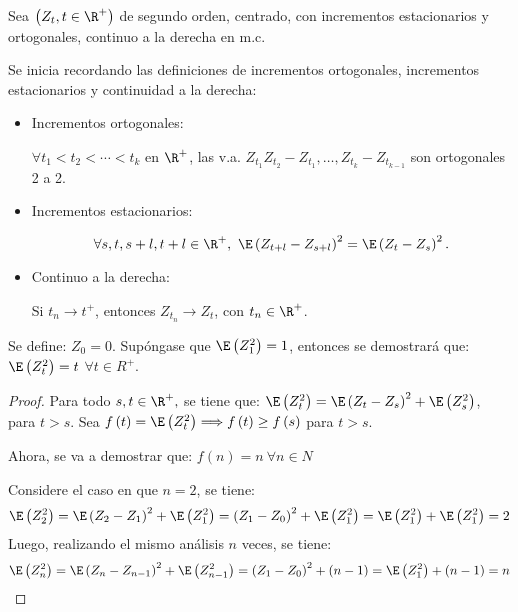\begin{ejemplo}
Sea $\left( Z_{t},t\in \R^{+} \right)$ de segundo orden, centrado, con incrementos estacionarios y ortogonales, continuo a la derecha en m.c. 

Se inicia recordando las definiciones de incrementos ortogonales, incrementos estacionarios y continuidad a la derecha:

\begin{itemize}
\item Incrementos ortogonales:\newline

$\forall t_{1}<t_{2}<\cdots <t_{k}$ en $\R^{+}$, las v.a. $Z_{t_{1}}Z_{t_{2}}-Z_{t_{1}},\ldots,Z_{t_{k}}-Z_{t_{k-1}}$ 
son ortogonales 2 a 2.


\item Incrementos estacionarios: 

\[
\forall  s,t,s+l,t+l \in \R^{+},\ \E\left(Z_{t+l}-Z_{s+l} \right)^{2}=\E\left( Z_{t}-Z_{s} \right)^{2}.
\]

\item Continuo a la derecha:\newline

Si $t_{n}\to t^{+}$, entonces $Z_{t_{n}}\to Z_{t}$, con $t_{n}\in\R^{+}$.

\end{itemize}

\begin{itemize}
\item Se define: $Z_{0}=0$. Sup\'{o}ngase que $\E\left( Z_{1}^{2} \right)=1$, entonces se demostrar\'{a} que: $\E\left( Z_{t}^{2} \right)=t$ $\forall t\in R^{+}$.

\begin{proof} 
Para todo $s,t \in \R^{+},$ se tiene que: $\E\left( Z_{t}^{2} \right)=\E\left( Z_{t}-Z_{s} \right)^{2}+\E\left( Z_{s}^{2} \right)$, para $t>s$. Sea $f\left( t \right)=\E\left( Z_{t}^{2} \right)\Longrightarrow f\left( t \right)\geq f\left( s \right)$ para $t>s$.

\item Ahora, se va a demostrar que: $f\left( n \right)=n\ \forall n\in N$

Considere el caso en que $n=2$, se tiene:
\[
\E\left( Z_{2}^{2} \right)=\E\left( Z_{2}-Z_{1} \right)^{2}+\E\left( Z_{1}^{2} 
\right)=\left( Z_{1}-Z_{0} \right)^{2}+\E\left( Z_{1}^{2} \right)=\E\left( 
Z_{1}^{2} \right)+\E\left( Z_{1}^{2} \right)=2
\]
Luego, realizando el mismo an\'{a}lisis $n$ veces, se tiene:
\[
\E\left( Z_{n}^{2} \right)=\E\left( Z_{n}-Z_{n-1} \right)^{2}+\E\left( 
Z_{n-1}^{2} \right)=\left( Z_{1}-Z_{0} \right)^{2}+\left( n-1 
\right)=\E\left( Z_{1}^{2} \right)+\left( n-1 \right)=n
\]


\end{proof}
\end{itemize}
\end{ejemplo}
